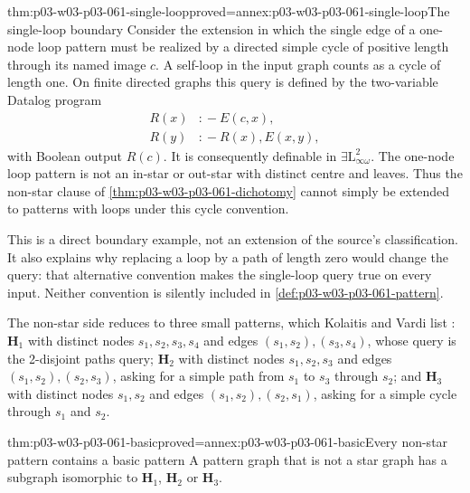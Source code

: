 \begin{hbtheorem}{thm:p03-w03-p03-061-single-loop}{proved=annex:p03-w03-p03-061-single-loop}{The single-loop boundary}
Consider the extension in which the single edge of a one-node loop pattern
must be realized by a directed simple cycle of positive length through its
named image \(c\). A self-loop in the input graph counts as a cycle of
length one. On finite directed graphs this query is defined by the
two-variable Datalog program
\[
\begin{aligned}
 R(x)&\mathrel{{:}\!-}E(c,x),\\
 R(y)&\mathrel{{:}\!-}R(x),E(x,y),
\end{aligned}
\]
with Boolean output \(R(c)\). It is consequently definable in
\(\exists\mathrm L^2_{\infty\omega}\). The one-node loop pattern is not
an in-star or out-star with distinct centre and leaves. Thus the non-star
clause of \cref{thm:p03-w03-p03-061-dichotomy} cannot simply be extended
to patterns with loops under this cycle convention.
\end{hbtheorem}

This is a direct boundary example, not an extension of the source's
classification. It also explains why replacing a loop by a path of length
zero would change the query: that alternative convention makes the
single-loop query true on every input. Neither convention is silently
included in \cref{def:p03-w03-p03-061-pattern}.

The non-star side reduces to three small patterns, which Kolaitis and Vardi
list \cite[pp.~27--28]{KolaitisVardi1995DatalogManuscript}:
\(\mathbf H_1\) with distinct nodes \(s_1,s_2,s_3,s_4\) and edges
\((s_1,s_2),(s_3,s_4)\), whose query is the 2-disjoint paths query;
\(\mathbf H_2\) with distinct nodes \(s_1,s_2,s_3\) and edges
\((s_1,s_2),(s_2,s_3)\), asking for a simple path from \(s_1\) to \(s_3\)
through \(s_2\); and \(\mathbf H_3\) with distinct nodes \(s_1,s_2\) and
edges \((s_1,s_2),(s_2,s_1)\), asking for a simple cycle through \(s_1\) and
\(s_2\).

\begin{hblemma}{thm:p03-w03-p03-061-basic}{proved=annex:p03-w03-p03-061-basic}{Every non-star pattern contains a basic pattern}
A pattern graph that is not a star graph has a subgraph isomorphic to
\(\mathbf H_1\), \(\mathbf H_2\) or \(\mathbf H_3\).
\end{hblemma}

